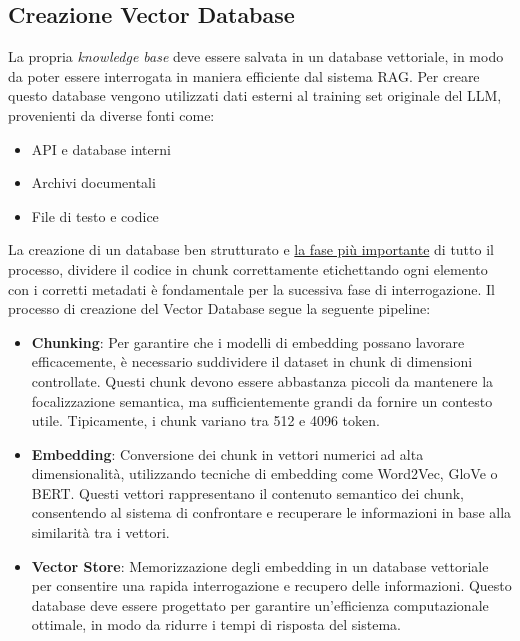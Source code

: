\documentclass[12pt,a4paper,openright,twoside]{book}
\begin{document}
\subsection{Creazione Vector Database}
La propria \emph{knowledge base} deve essere salvata in un database vettoriale, in modo da poter essere interrogata in maniera efficiente dal sistema RAG.
Per creare questo database vengono utilizzati dati esterni al training set originale del LLM, provenienti da diverse fonti come:
\begin{itemize}
    \item API e database interni
    \item Archivi documentali
    \item File di testo e codice
\end{itemize}
La creazione di un database ben strutturato e \underline{la fase più importante} di tutto il processo, dividere il codice in chunk correttamente etichettando ogni elemento con i corretti metadati è fondamentale per la sucessiva fase di interrogazione.
Il processo di creazione del Vector Database segue la seguente pipeline:
\begin{itemize}
    \item \textbf{Chunking}: Per garantire che i modelli di embedding possano lavorare efficacemente, è necessario suddividere il dataset in chunk di dimensioni controllate.
    Questi chunk devono essere abbastanza piccoli da mantenere la focalizzazione semantica, ma sufficientemente grandi da fornire un contesto utile.
    Tipicamente, i chunk variano tra 512 e 4096 token.
    \item \textbf{Embedding}: Conversione dei chunk in vettori numerici ad alta dimensionalità, utilizzando tecniche di embedding come Word2Vec, GloVe o BERT.
    Questi vettori rappresentano il contenuto semantico dei chunk, consentendo al sistema di confrontare e recuperare le informazioni in base alla similarità tra i vettori.
    \item \textbf{Vector Store}: Memorizzazione degli embedding in un database vettoriale per consentire una rapida interrogazione e recupero delle informazioni.
    Questo database deve essere progettato per garantire un'efficienza computazionale ottimale, in modo da ridurre i tempi di risposta del sistema.
\end{itemize}
\end{document}
